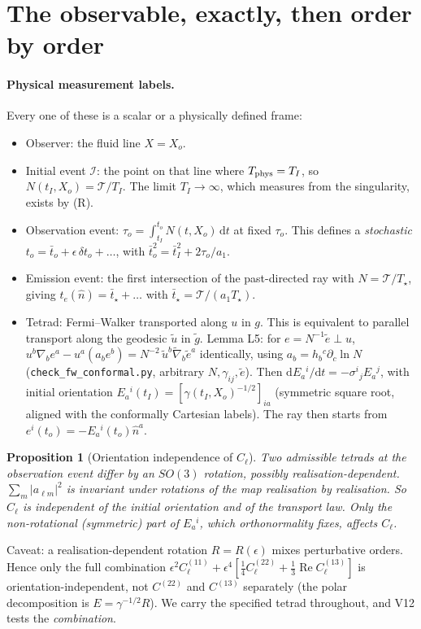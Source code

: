 \documentclass[11pt]{article}
\newtheorem{proposition}{Proposition}
\theoremstyle{definition}
\theoremstyle{remark}
\newcommand{\Tref}{\mathcal{T}}
\newcommand{\eps}{\epsilon}
\newcommand{\nhat}{\hat n}
\newcommand{\dd}{\mathrm{d}}
\begin{document}
\section{The observable, exactly, then order by order}\label{sec:obs}

\paragraph{Physical measurement labels.} Every one of these is a scalar or a
physically defined frame:
\begin{itemize}
\item Observer: the fluid line $X=X_o$.
\item Initial event $\mathcal I$: the point on that line where
$T_{\rm phys}=T_I$, so $N(t_I,X_o)=\Tref/T_I$. The limit $T_I\to\infty$,
which measures from the singularity, exists by (R).
\item Observation event: $\tau_o=\int_{t_I}^{t_o}N(t,X_o)\,\dd t$ at fixed
$\tau_o$. This defines a \emph{stochastic} $t_o=\bar t_o+\eps\,\delta t_o+\dots$,
with $\bar t_o^2=\bar t_I^2+2\tau_o/a_1$.
\item Emission event: the first intersection of the past-directed ray with
$N=\Tref/T_\star$, giving $t_e(\nhat)=\bar t_\star+\dots$ with
$\bar t_\star=\Tref/(a_1T_\star)$.
\item Tetrad: Fermi--Walker transported along $u$ in $g$. This is equivalent
to parallel transport along the geodesic $\tilde u$ in $\tilde g$.
Lemma L5: for $e=N^{-1}\tilde e\perp u$,
$u^b\nabla_be^a-u^a(a_be^b)=N^{-2}\,\tilde u^b\tilde\nabla_b\tilde e^a$
identically, using $a_b=h_b{}^c\partial_c\ln N$ (\texttt{check\_fw\_conformal.py},
arbitrary $N,\gamma_{ij},\tilde e$). Then $\dd E_a{}^i/\dd t=-\sigma^i{}_jE_a{}^j$, with
initial orientation $E_a{}^i(t_I)=[\gamma(t_I,X_o)^{-1/2}]_{ia}$ (symmetric
square root, aligned with the conformally Cartesian labels). The ray then
starts from $e^i(t_o)=-E_a{}^i(t_o)\nhat^a$.
\end{itemize}

\begin{proposition}[Orientation independence of $C_\ell$]
Two admissible tetrads at the observation event differ by an $SO(3)$
rotation, possibly realisation-dependent. $\sum_m|a_{\ell m}|^2$ is invariant
under rotations of the map \emph{realisation by realisation}. So $C_\ell$ is
independent of the initial orientation and of the transport law. Only the
non-rotational (symmetric) part of $E_a{}^i$, which orthonormality fixes,
affects $C_\ell$.
\end{proposition}
\noindent
Caveat: a realisation-dependent rotation $R=R(\eps)$ mixes perturbative
orders. Hence only the full combination
$\eps^2C^{(11)}_\ell+\eps^4[\tfrac14C^{(22)}_\ell+\tfrac13\operatorname{Re}C^{(13)}_\ell]$
is orientation-independent, not $C^{(22)}$ and $C^{(13)}$ separately (the
polar decomposition is $E=\gamma^{-1/2}R$). We carry the specified tetrad
throughout, and V12 tests the \emph{combination}.
\end{document}
